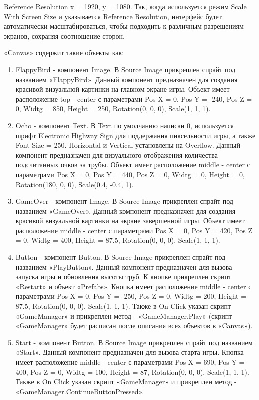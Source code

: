 \documentclass[14pt, oneside]{altsu-report}
\begin{document}
Reference Resolution x = 1920, y = 1080. Так, когда используется режим Scale With Screen Size и указывается Reference Resolution, интерфейс будет автоматически масштабироваться, чтобы подходить к различным разрешениям экранов, сохраняя соотношение сторон.

«Canvas» содержит такие объекты как:

\begin{enumerate}
\item FlappyBird - компонент Image. В Source Image прикреплен спрайт под названием «FlappyBird». Данный компонент предназначен для создания красивой визуальной картинки на главном экране игры. Объект имеет расположение top - center с параметрами Pos X = 0, Pos Y = -240, Pos Z = 0, Widtg = 850, Height = 250, Rotation(0, 0, 0), Scale(1, 1, 1).
\item Ocho - компонент Text. В Text по умолчанию написан 0, используется шрифт Electronic Highway Sign для поддержания пиксельности игры, а также Font Size = 250. Horizontal и Vertical установлены на Overflow. Данный компонент предназначен для визуального отображения количества подсчитанных очков за трубы. Объект имеет расположение middle - center с параметрами Pos X = 0, Pos Y = 440, Pos Z = 0, Widtg = 0, Height = 0, Rotation(180, 0, 0), Scale(0.4, -0.4, 1).
\item GameOver - компонент Image. В Source Image прикреплен спрайт под названием «GameOver». Данный компонент предназначен для создания красивой визуальной картинки на экране завершенной игры. Объект имеет расположение middle - center с параметрами Pos X = 0, Pos Y = 420, Pos Z = 0, Widtg = 400, Height = 87.5, Rotation(0, 0, 0), Scale(1, 1, 1).
\item Button - компонент Button. В Source Image прикреплен спрайт под названием «PlayButton». Данный компонент предназначен для вызова запуска игры и обновления высоты труб. К кнопке прикреплен скрипт «Restart» и объект «Prefabs». Кнопка имеет расположение middle - center с параметрами Pos X = 0, Pos Y = -250, Pos Z = 0, Widtg = 200, Height = 87.5, Rotation(0, 0, 0), Scale(1, 1, 1). Также в On Click указан скрипт «GameManager» и прикреплен метод - «GameManager.Play» (скрипт «GameManager» будет расписан после описания всех объектов в «Canvas»).
\item Start - компонент Button. В Source Image прикреплен спрайт под названием «Start». Данный компонент предназначен для вызова старта игры. Кнопка имеет расположение middle - center с параметрами Pos X = 690, Pos Y = 400, Pos Z = 0, Widtg = 100, Height = 87, Rotation(0, 0, 0), Scale(1, 1, 1). Также в On Click указан скрипт «GameManager» и прикреплен метод - «GameManager.ContinueButtonPressed».

\end{enumerate}
\end{document}

